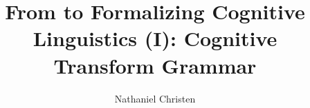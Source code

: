\documentclass[10pt,twocolumn ]{article}
\begin{document}
\title{From  to 
Formalizing Cognitive Linguistics (I): Cognitive Transform Grammar}
\author{Nathaniel Christen}
\newsavebox{\qboxi}
\newsavebox{\qboxii}
\end{document}
